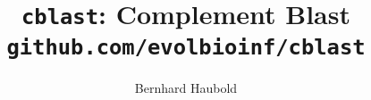 \documentclass[a4paper]{article}
\begin{document}
\pagestyle{noweb}

\title{\texttt{cblast}: Complement Blast\\
\small\texttt{github.com/evolbioinf/cblast}}
\author{Bernhard Haubold}
\maketitle


% 
\end{document}
